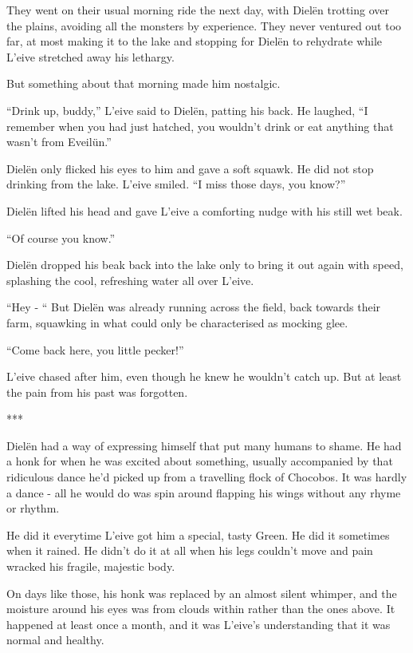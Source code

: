 \noindent They went on their usual morning ride the next day, with Dielën trotting over the plains, avoiding all the monsters by experience. They never ventured out too far, at most making it to the lake and stopping for Dielën to rehydrate while L'eive stretched away his lethargy.

But something about that morning made him nostalgic.

“Drink up, buddy,” L'eive said to Dielën, patting his back. He laughed, “I remember when you had just hatched, you wouldn’t drink or eat anything that wasn’t from Eveilün.”

Dielën only flicked his eyes to him and gave a soft squawk. He did not stop drinking from the lake. L'eive smiled. “I miss those days, you know?”

Dielën lifted his head and gave L'eive a comforting nudge with his still wet beak.

“Of course you know.”

Dielën dropped his beak back into the lake only to bring it out again with speed, splashing the cool, refreshing water all over L'eive.

“Hey - “ But Dielën was already running across the field, back towards their farm, squawking in what could only be characterised as mocking glee.

“Come back here, you little pecker!”

L'eive chased after him, even though he knew he wouldn’t catch up. But at least the pain from his past was forgotten.

\begin{center}
    ***
\end{center}

\noindent Dielën had a way of expressing himself that put many humans to shame. He had a honk for when he was excited about something, usually accompanied by that ridiculous dance he’d picked up from a travelling flock of Chocobos. It was hardly a dance - all he would do was spin around flapping his wings without any rhyme or rhythm. 

He did it everytime L'eive got him a special, tasty Green. He did it sometimes when it rained. He didn’t do it at all when his legs couldn’t move and pain wracked his fragile, majestic body.

On days like those, his honk was replaced by an almost silent whimper, and the moisture around his eyes was from clouds within rather than the ones above. It happened at least once a month, and it was L'eive’s understanding that it was normal and healthy. 

